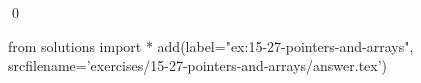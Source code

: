 
\begin{ex}
  \label{ex:15-27-pointers-and-arrays}
  
  \qed
\end{ex}
\begin{python0}
from solutions import *
add(label="ex:15-27-pointers-and-arrays",
    srcfilename='exercises/15-27-pointers-and-arrays/answer.tex')
\end{python0}
